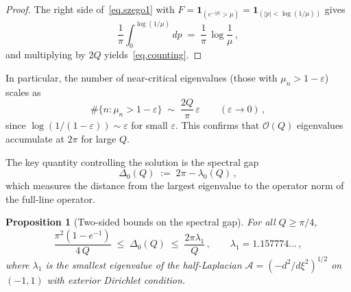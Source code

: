 \documentclass[11pt,a4paper]{article}
\newtheorem{proposition}[theorem]{Proposition}
\theoremstyle{definition}
\begin{document}
\begin{proof}
The right side of~\eqref{eq.szego1} with $F = \mathbf{1}_{(e^{-|p|} > \mu)}
= \mathbf{1}_{(|p| < \log(1/\mu))}$ gives
\begin{equation}
  \frac{1}{\pi}\int_0^{\log(1/\mu)} dp
  \;=\; \frac{1}{\pi}\, \log\frac{1}{\mu}\,,
\end{equation}
and multiplying by $2Q$ yields~\eqref{eq.counting}.
\end{proof}

In particular, the number of near-critical eigenvalues (those with
$\mu_n > 1 - \varepsilon$) scales as
\begin{equation}
  \#\{n : \mu_n > 1 - \varepsilon\}
  \;\sim\;
  \frac{2Q}{\pi}\, \varepsilon
  \qquad (\varepsilon \to 0)\,,
\end{equation}
since $\log(1/(1-\varepsilon)) \sim \varepsilon$ for small $\varepsilon$.
This confirms that $\mathcal O(Q)$ eigenvalues accumulate at $2\pi$ for large $Q$.

The key quantity controlling the solution is the spectral gap
\begin{equation}
  \Delta_0(Q) \;:=\; 2\pi - \lambda_0(Q)\,,
\end{equation}
which measures the distance from the largest eigenvalue to the operator
norm of the full-line operator.

\begin{proposition}[Two-sided bounds on the spectral gap]\label{prop:gap}
  For all $Q \geq \pi/4$,
  \begin{equation}\label{eq.gap-upper}
    \frac{\pi^2\left(1 - e^{-1}\right)}{4\,Q}
    \;\leq\;
    \Delta_0(Q)
    \;\leq\;
    \frac{2\pi\lambda_1}{Q}\,,
    \qquad \lambda_1 = 1.157774\ldots\,,
  \end{equation}
  where $\lambda_1$ is the smallest eigenvalue of the half-Laplacian
  $\mathcal{A} = (-d^2/d\xi^2)^{1/2}$ on $(-1,1)$ with exterior Dirichlet
  condition.
\end{proposition}
\end{document}
